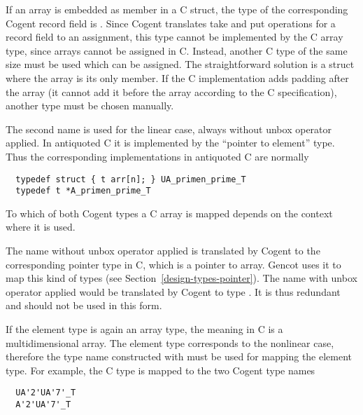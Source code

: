 If an array is embedded as member in a C struct, the type of the corresponding Cogent record field
is . Since Cogent translates take and put operations for a record field to an assignment,
this type cannot be implemented by the C array type, since arrays cannot be assigned in C. Instead,
another C type of the same size must be used which can be assigned. The straightforward solution is
a struct where the array is its only member. If the C implementation adds padding after the array (it
cannot add it before the array according to the C specification), another type must be chosen manually.

The second name is used for the linear
case, always without unbox operator applied. In antiquoted C it is implemented by the ``pointer to
element'' type. Thus the corresponding implementations in antiquoted C are normally
\begin{verbatim}
  typedef struct { t arr[n]; } UA_primen_prime_T
  typedef t *A_primen_prime_T
\end{verbatim}

To which of both Cogent types a C array is mapped depends on the context where it is used.

The name  without unbox operator applied is translated by Cogent to the corresponding 
pointer type in C, which is a pointer to array. Gencot uses it to map this kind of types (see 
Section~\ref{design-types-pointer}).
The name  with unbox operator applied would be translated by Cogent to type .
It is thus redundant and should not be used in this form.

If the element type  is again an array type, the meaning in C is a multidimensional array. The
element type corresponds to the nonlinear case, therefore the type name constructed with 
must be used for mapping the element type. For example, the C type  is mapped to the
two Cogent type names
\begin{verbatim}
  UA'2'UA'7'_T
  A'2'UA'7'_T
\end{verbatim}


